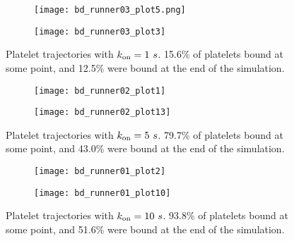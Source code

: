 \documentclass{article}
\newcommand{\tn}{\textnormal}
\begin{document}
\pagestyle{plain}



\begin{figure}[h]
  \centering
  \begin{subfigure}{0.49\textwidth}
    \texttt{[image: bd\_runner03\_plot5.png]}
  \end{subfigure}
  \hfill
  \begin{subfigure}{0.49\textwidth}
    \texttt{[image: bd\_runner03\_plot3]}
  \end{subfigure}
  \caption{Platelet trajectories with $k_\tn{on} = 1 \ s$. 15.6\% of
    platelets bound at some point, and 12.5\% were bound at the end of
    the simulation.}
  \label{fig:traj03}
\end{figure}

\begin{figure}
  \centering
  \begin{subfigure}{0.49\textwidth}
    \texttt{[image: bd\_runner02\_plot1]}
  \end{subfigure}
  \hfill
  \begin{subfigure}{0.49\textwidth}
    \texttt{[image: bd\_runner02\_plot13]}
  \end{subfigure}  
  \caption{Platelet trajectories with $k_\tn{on} = 5 \ s$. 79.7\% of
    platelets bound at some point, and 43.0\% were bound at the end of
  the simulation.}
  \label{fig:traj02}
\end{figure}

\begin{figure}
  \centering
  \begin{subfigure}{0.49\textwidth}
    \texttt{[image: bd\_runner01\_plot2]}
  \end{subfigure}
  \hfill
  \begin{subfigure}{0.49\textwidth}
    \texttt{[image: bd\_runner01\_plot10]}
  \end{subfigure}  
  \caption{Platelet trajectories with $k_\tn{on} = 10 \ s$. 93.8\% of
    platelets bound at some point, and 51.6\% were bound at the end of
    the simulation.}
  \label{fig:traj14}
\end{figure}
\end{document}
